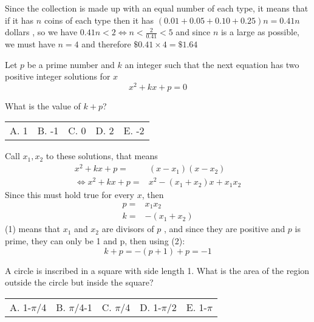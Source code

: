 \documentclass[12pt]{article}
\makeatletter
\newcounter{problem}
\newcommand{\multChoice}[5]{
    \begin{tabular}{l @{\hskip 1.5cm} l @{\hskip 1.5cm} l @{\hskip 1.5cm} l @{\hskip 1.5cm} l}
    A. #1 & B. #2 & C. #3 & D. #4 & E. #5
\end{tabular}

}
\makeatother
\begin{document}
\begin{spacing}{1.3}
\begin{solution}[\$1.64]
   Since the collection is made up with an equal number of each type, it means that if it 
    has $n$ coins of each type then it has $(0.01+0.05+0.10+0.25)n=0.41n$ dollars , so we 
    have $0.41n<2 \iff n<\frac{2}{0.41}<5$ and since $n$ is a large as possible, we must 
    have $n=4$ and therefore $\$0.41\times4=\$1.64$
\end{solution}

\begin{problem}
   Let $p$ be a prime number and $k$ an integer such that the next
    equation has two positive integer solutions for $x$
    $$ x^2 + kx + p = 0 $$

    What is the value of $k + p$? \\
   \multChoice{1}{-1}{0}{2}{-2}
\end{problem}

\begin{solution}[B]
   Call $x_1,x_2$ to these solutions, that means
    \begin{align*}
    x^2+kx+p=&(x-x_1)(x-x_2) \\
    \iff x^2+kx+p=&x^2-(x_1+x_2)x+x_1x_2
    \end{align*}
    Since this must hold true for every $x$, then 
   \begin{align}
       p=&x_1x_2 \\
       k =& -(x_1+x_2)
   \end{align}
    (1) means that $x_1$ and $x_2$ are divisors of $p$ , and since they are positive
    and $p$ is prime, they can only be 1 and p, then using (2):
    $$k+p = -(p+1) + p = -1$$
\end{solution}


\begin{problem}
   A circle is inscribed in a square with side length 1. What is the
    area of the region outside the circle but inside the square? \\
   \multChoice{1-$\pi$/4}{$\pi$/4-1}{$\pi$/4}{1-$\pi$/2}{1-$\pi$}
\end{problem}
\begin{solution}[E]
\end{solution}
\end{spacing}
\end{document}
